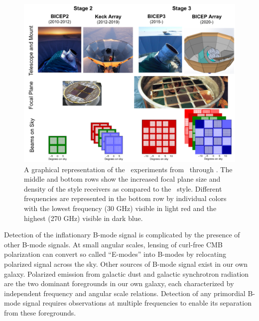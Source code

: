 \documentclass[]{spie}  %
\begin{document}
\begin{figure}[h]
	\center
	\includegraphics[scale=0.5]{progression.pdf}
	\caption{A graphical representation of the \bk\ experiments from
	\ through \biceparray. The middle and bottom rows show the increased focal plane size and density of the  style receivers as compared to the \ style. Different
	frequencies are represented in the bottom row by individual colors with the lowest frequency
	(30 GHz) visible in light red and the highest (270 GHz) visible in dark
	blue.}
	\label{fig:progression}
\end{figure}

Detection of the inflationary B-mode signal is complicated by the presence of
other B-mode signals. At small angular scales, lensing of curl-free CMB
polarization can convert so called ``E-modes'' into B-modes by relocating
polarized signal across the sky. Other sources of B-mode signal exist in our
own galaxy. Polarized emission from galactic dust and galactic synchrotron
radiation are the two dominant foregrounds in our own galaxy, each
characterized by independent frequency and angular scale relations. Detection
of any primordial B-mode signal requires observations at multiple frequencies
to enable its separation from these foregrounds. 
\end{document}
